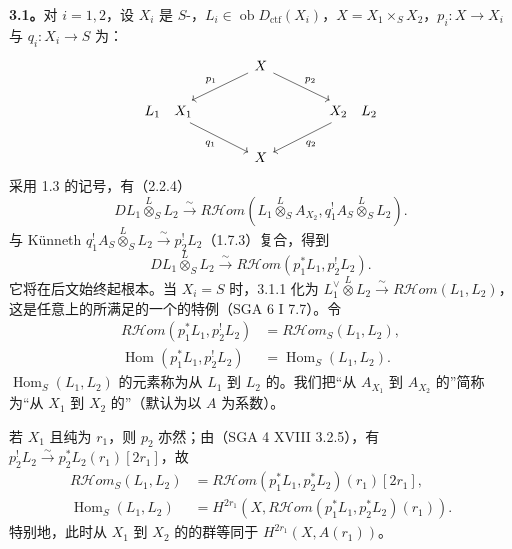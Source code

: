 \textbf{3.1。}对 $i=1,2$，设 $X_i$ 是 $S$-，$L_i\in\operatorname{ob}D_{\mathrm{ctf}}(X_i)$，$X=X_1\times_S X_2$，$p_i:X\to X_i$ 与 $q_i:X_i\to S$ 为：
\[
\begin{tikzcd}[column sep=large]
& X\arrow[dl,"p_1"']\arrow[dr,"p_2"] &\\
L_1\quad X_1\arrow[dr,"q_1"'] && X_2\quad L_2\arrow[dl,"q_2"]\\
& X &
\end{tikzcd}
\]
采用 1.3 的记号，有（2.2.4）
\[
DL_1\mathbin{\overset L\otimes}_S L_2\xrightarrow\sim
R\mathcal Hom(L_1\mathbin{\overset L\otimes}_S A_{X_2},q_1^!A_S\mathbin{\overset L\otimes}_S L_2).
\]
与 Künneth  $q_1^!A_S\mathbin{\overset L\otimes}_S L_2\xrightarrow\sim p_2^!L_2$（1.7.3）复合，得到
\[
DL_1\mathbin{\overset L\otimes}_S L_2\xrightarrow\sim R\mathcal Hom(p_1^*L_1,p_2^!L_2).\tag{3.1.1}
\]
它将在后文始终起根本。当 $X_i=S$ 时，3.1.1 化为 $L_1^\vee\mathbin{\overset L\otimes}L_2\xrightarrow\sim R\mathcal Hom(L_1,L_2)$，这是任意上的所满足的一个的特例（SGA 6 I 7.7）。令
\[
\begin{aligned}
R\mathcal Hom(p_1^*L_1,p_2^!L_2)&=R\mathcal Hom_S(L_1,L_2),\\
\operatorname{Hom}(p_1^*L_1,p_2^!L_2)&=\operatorname{Hom}_S(L_1,L_2).
\end{aligned}\tag{3.1.2}
\]
$\operatorname{Hom}_S(L_1,L_2)$ 的元素称为从 $L_1$ 到 $L_2$ 的。我们把“从 $A_{X_1}$ 到 $A_{X_2}$ 的”简称为“从 $X_1$ 到 $X_2$ 的”（默认为以 $A$ 为系数）。

若 $X_1$ 且纯为 $r_1$，则 $p_2$ 亦然；由（SGA 4 XVIII 3.2.5），有
$p_2^!L_2\xrightarrow\sim p_2^*L_2(r_1)[2r_1]$，故
\[
\begin{aligned}
R\mathcal Hom_S(L_1,L_2)&=R\mathcal Hom(p_1^*L_1,p_2^*L_2)(r_1)[2r_1],\\
\operatorname{Hom}_S(L_1,L_2)&=H^{2r_1}(X,R\mathcal Hom(p_1^*L_1,p_2^*L_2)(r_1)).
\end{aligned}\tag{3.1.3}
\]
特别地，此时从 $X_1$ 到 $X_2$ 的的群等同于 $H^{2r_1}(X,A(r_1))$。


